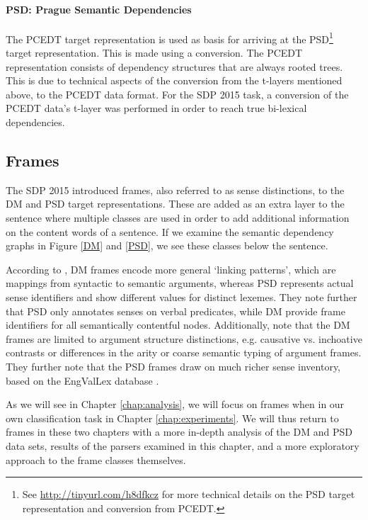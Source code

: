 \paragraph{PSD: Prague Semantic Dependencies} The PCEDT target representation is used as basis for arriving at the PSD\footnote{See \url{http://tinyurl.com/h8dfkcz} for more technical details on the PSD target representation and conversion from PCEDT.} target representation. This is made using a conversion. The PCEDT representation consists of dependency structures that are always rooted trees. This is due to technical aspects of the conversion from the t-layers mentioned above, to the PCEDT data format. For the SDP 2015 task, a conversion of the PCEDT data's t-layer was performed in order to reach true bi-lexical dependencies.

\subsection{Frames}
\label{sec:frames}

The SDP 2015 introduced frames, also referred to as sense distinctions, to the DM and PSD target representations. These are added as an extra layer to the sentence where multiple classes are used in order to add additional information on the content words of a sentence. If we examine the semantic dependency graphs in Figure \ref{DM} and \ref{PSD}, we see these classes below the sentence.

According to , DM frames encode more general `linking patterns', which are mappings from syntactic to semantic arguments, whereas PSD represents actual sense identifiers and show different values for distinct lexemes. They note further that PSD only annotates senses on verbal predicates, while DM provide frame identifiers for all semantically contentful nodes. Additionally,  note that the DM frames are limited to argument structure distinctions, e.g. causative vs. inchoative contrasts or differences in the arity or coarse semantic typing of argument frames. They further note that the PSD frames draw on much richer sense inventory, based on the EngValLex database \cite{Cinkova:06}.

As we will see in Chapter \ref{chap:analysis}, we will focus on frames when in our own classification task in Chapter \ref{chap:experiments}. We will thus return to frames in these two chapters with a more in-depth analysis of the DM and PSD data sets, results of the parsers examined in this chapter, and a more exploratory approach to the frame classes themselves.

